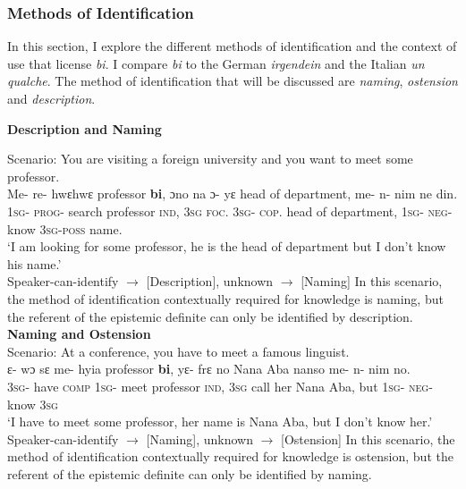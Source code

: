 \documentclass[output=paper,modfonts]{langsci/langscibook}
\begin{document}
\subsubsection{Methods of Identification}
In this section, I explore the different methods of identification and the context of use that license \emph{bi}. I compare \emph{bi} to the German \emph{irgendein} and the Italian \emph{un qualche}. The method of identification that will be discussed are \emph{naming}, \emph{ostension} and \emph{description}.

\textbf{Description and Naming}

Scenario: You are visiting a foreign university and you want to meet some professor. 
\ea\label{ex45}\\
\gll Me- re- hwεhwε professor \textbf{bi}, ɔno na ɔ- yε head of department, me- n- nim ne din.\\
\textsc{1sg}- \textsc{prog}- search professor \textsc{ind}, \textsc{3sg} \textsc{foc}. \textsc{3sg}- \textsc{cop}. head of department, \textsc{1sg}- \textsc{neg}- know \textsc{3sg}-\textsc{poss} name.\\
\glt `I am looking for some professor, he is the head of department but I don't know his name.'\\
	Speaker-can-identify $\rightarrow$ [Description], unknown $\rightarrow$  [Naming]
 \z  In this scenario, the method of identification contextually required for knowledge is naming, but the referent of the epistemic definite can only be identified by description. \\
\textbf{Naming and Ostension}\\
Scenario: At a conference, you have to meet a famous linguist.
\ea\label{ex45}\\
\gll ε- wɔ  sε me- hyia professor \textbf{bi}, yε- frε no Nana Aba nanso me- n- nim no.\\
\textsc{3sg}- have \textsc{comp} \textsc{1sg}- meet professor \textsc{ind}, \textsc{3sg} call her Nana Aba, but \textsc{1sg}- \textsc{neg}- know \textsc{3sg}\\
\glt `I have to meet some professor, her name is Nana Aba, but I don't know her.'\\
	Speaker-can-identify $\rightarrow$ [Naming], unknown $\rightarrow$  [Ostension]
 \z In this scenario, the method of identification contextually required for knowledge is ostension, but the referent of the epistemic definite can only be identified by naming. \\
\end{document}
